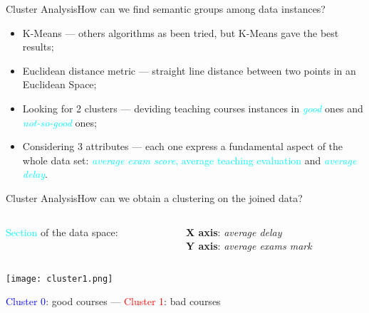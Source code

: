 \begin{frame}{Cluster Analysis}{How can we find semantic groups among data instances?}

\vspace{0.1cm}
 \vspace{0,3cm}
\vspace{-0.2cm}
	\begin{block}{}
		\begin{itemize}
			\item<1-> \alert{K-Means} --- others algorithms as been tried, but K-Means gave the best results; \vspace{0.2cm}
            \item<2-> \alert{Euclidean distance metric} --- straight line distance between two points in an Euclidean Space; \vspace{0.2cm}
			\item<3-> \alert{Looking for 2 clusters} --- deviding teaching courses instances in \textcolor{cyan}{\emph{good}} ones and \textcolor{cyan}{\emph{not-so-good}} ones; \vspace{0.2cm}
			\item<4-> \alert{Considering 3 attributes} --- each one express a fundamental aspect of the whole data set: \textcolor{cyan}{\emph{average exam score}, \textcolor{cyan}{average teaching evaluation}} and \textcolor{cyan}{\emph{average delay}}.
		\end{itemize}
	\end{block}

\end{frame}

\begin{frame}{Cluster Analysis}{How can we obtain a clustering on the joined data?}

\vspace{0.2cm}
\begin{columns}
\begin{column}{0.5\textwidth}
   \textcolor{cyan}{Section} of the data space:
\end{column}
\begin{column}{0.5\textwidth}
     \textbf{X axis}: \emph{average delay} \\ \textbf{Y axis}: \emph{average exams mark}
\end{column}
\end{columns}

    \vspace{0.1cm}
    \begin{centering}
        \hspace{0.5cm}\texttt{[image: cluster1.png]}
    \end{centering}

    \textcolor{blue}{Cluster 0}: good courses --- \textcolor{red}{Cluster 1}: bad courses

\end{frame}

